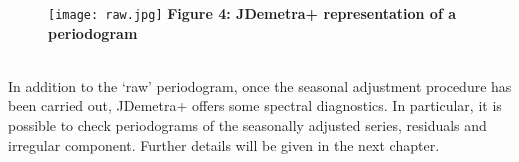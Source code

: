 \documentclass{article}
\begin{document}
\begin{figure}[h!]
\texttt{[image: raw.jpg]}
\centering
{\textbf{\scriptsize Figure 4: JDemetra+ representation of a periodogram}}
\end{figure}
\\In addition to the ‘raw’ periodogram, once the seasonal adjustment procedure has been carried out, JDemetra+ offers some spectral diagnostics. In particular, it is possible to check periodograms of the seasonally adjusted series, residuals and irregular component. Further details will be given in the next chapter.
\end{document}
